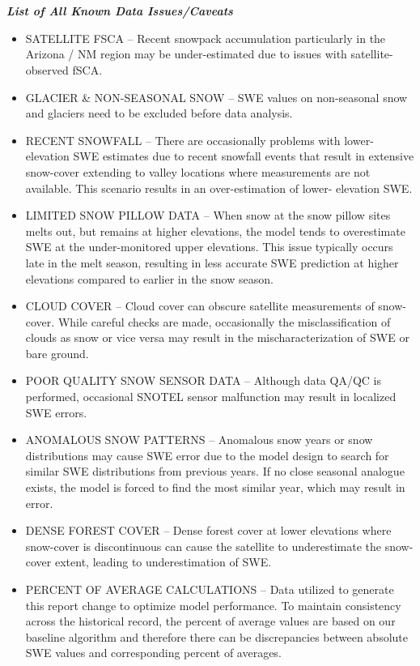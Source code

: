 \documentclass{article}
\begin{document}
\section*{}\label{sec:data_issues}\vspace{-3em}
\fontsize{12}{16}
\noindent\textbf{\textit{List of All Known Data Issues/Caveats}}
\fontsize{10}{14}
\begin{itemize}
    \item SATELLITE FSCA – Recent snowpack accumulation particularly in the Arizona / NM region may be under-estimated due to issues with satellite-observed fSCA.
    \item GLACIER \& NON-SEASONAL SNOW – SWE values on non-seasonal snow and glaciers need to be excluded before data analysis.
    \item RECENT SNOWFALL – There are occasionally problems with lower-elevation SWE estimates due to recent snowfall events that result in extensive snow-cover extending to valley locations where measurements are not available. This scenario results in an over-estimation of lower- elevation SWE.
    \item LIMITED SNOW PILLOW DATA – When snow at the snow pillow sites melts out, but remains at higher elevations, the model tends to overestimate SWE at the under-monitored upper elevations. This issue typically occurs late in the melt season, resulting in less accurate SWE prediction at higher elevations compared to earlier in the snow season. 
    \item CLOUD COVER – Cloud cover can obscure satellite measurements of snow-cover. While careful checks are made, occasionally the misclassification of clouds as snow or vice versa may result in the mischaracterization of SWE or bare ground.
    \item POOR QUALITY SNOW SENSOR DATA – Although data QA/QC is performed, occasional SNOTEL sensor malfunction may result in localized SWE errors.
    \item ANOMALOUS SNOW PATTERNS – Anomalous snow years or snow distributions may cause SWE error due to the model design to search for similar SWE distributions from previous years. If no close seasonal analogue exists, the model is forced to find the most similar year, which may result in error.
    \item DENSE FOREST COVER – Dense forest cover at lower elevations where snow-cover is discontinuous can cause the satellite to underestimate the snow-cover extent, leading to underestimation of SWE.
    \item PERCENT OF AVERAGE CALCULATIONS – Data utilized to generate this report change to optimize model performance.  To maintain consistency across the historical record, the percent of average values are based on our baseline algorithm and therefore there can be discrepancies between absolute SWE values and corresponding percent of averages.

\end{itemize}
\end{document}
